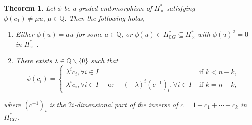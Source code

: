 \documentclass{amsart}
\newtheorem{theorem}{Theorem}[section]
\begin{document}
	\begin{theorem}\label{main thm}
		Let $\phi$ be a graded endomorphism of $H^*_{\times}$ satisfying $\phi(c_1) \neq \mu u,\, \mu \in \mathbb{Q}$.  
		Then the following %
holds, \begin{enumerate}
			\item Either %
$\phi(u)=au$ for some $a \in \mathbb{Q}$, or $\phi(u) \in H^*_{\mathbb{C}G} \subseteq H^*_{\times}$ with $\phi(u)^2=0$ in $H^*_{\times}$%
.
			\item There %
exists $\lambda \in \mathbb Q\backslash\{0\}$ such that
			$$\phi(c_i) = \begin{cases}
				\lambda^i c_i,   \forall i \in I& \text{ if } k<n-k,\\
				\lambda^i c_i,  \forall i \in I \quad \text{ or } \quad(-\lambda)^i (c^{-1})_i,    \forall i \in I & \text{ if } k= n-k,
			\end{cases}$$
		\end{enumerate} where $ (c^{-1})_i $ is the $ 2i $-dimensional part of the inverse of $ c = 1 + c_1 + \cdots + c_k $ in $ H^*_{ \mathbb CG} $.
	\end{theorem}
	
	
\end{document}
